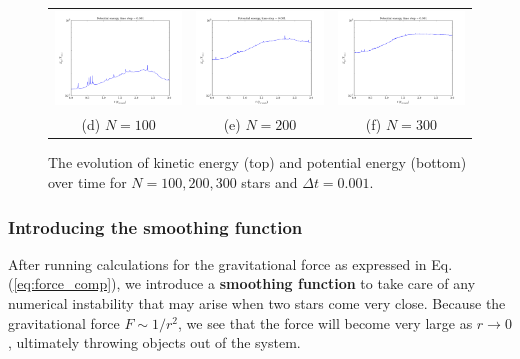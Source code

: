 \documentclass{article}
\begin{document}
\begin{multicols}{2}
\begin{figure}
\begin{center}
\begin{tabular}{ccc}
	  \includegraphics[width=60mm]{Images/Ep_100stars.png}
	& \includegraphics[width=60mm]{Images/Ep_200stars.png}
	& \includegraphics[width=60mm]{Images/Ep_300stars.png} \\
	(d) $N = 100$		& (e) $N = 200$  	& (f) $N = 300$ \\[6pt]
\end{tabular}
\caption{The evolution of kinetic energy (top) and potential energy (bottom) over time for $N = 100, 200, 300$ stars and $\Delta t = 0.001$.}\label{fig:Nbody_energy}
\end{center}
\end{figure}



\subsubsection{Introducing the smoothing function}

After running calculations for the gravitational force as expressed in Eq. (\ref{eq:force_comp}), we introduce a \textbf{smoothing function} to take care of any numerical instability that may arise when two stars come very close. Because the gravitational force $F \sim 1/r^2$, we see that the force will become very large as $r \rightarrow 0$, ultimately throwing objects out of the system. 


\end{multicols}
\end{document}
